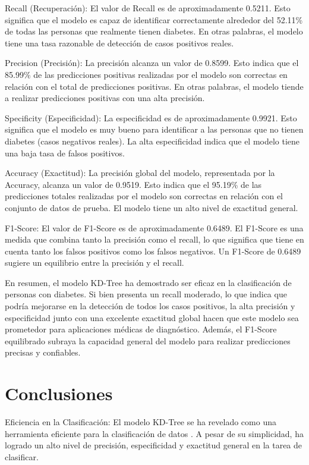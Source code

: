 \documentclass[]{article}
\begin{document}
Recall (Recuperación): El valor de Recall es de aproximadamente 0.5211. Esto significa que el modelo es capaz de identificar correctamente alrededor del 52.11\% de todas las personas que realmente tienen diabetes. En otras palabras, el modelo tiene una tasa razonable de detección de casos positivos reales.

Precision (Precisión): La precisión alcanza un valor de 0.8599. Esto indica que el 85.99\% de las predicciones positivas realizadas por el modelo son correctas en relación con el total de predicciones positivas. En otras palabras, el modelo tiende a realizar predicciones positivas con una alta precisión.

Specificity (Especificidad): La especificidad es de aproximadamente 0.9921. Esto significa que el modelo es muy bueno para identificar a las personas que no tienen diabetes (casos negativos reales). La alta especificidad indica que el modelo tiene una baja tasa de falsos positivos.

Accuracy (Exactitud): La precisión global del modelo, representada por la Accuracy, alcanza un valor de 0.9519. Esto indica que el 95.19\% de las predicciones totales realizadas por el modelo son correctas en relación con el conjunto de datos de prueba. El modelo tiene un alto nivel de exactitud general.

F1-Score: El valor de F1-Score es de aproximadamente 0.6489. El F1-Score es una medida que combina tanto la precisión como el recall, lo que significa que tiene en cuenta tanto los falsos positivos como los falsos negativos. Un F1-Score de 0.6489 sugiere un equilibrio entre la precisión y el recall.

En resumen, el modelo KD-Tree ha demostrado ser eficaz en la clasificación de personas con diabetes. Si bien presenta un recall moderado, lo que indica que podría mejorarse en la detección de todos los casos positivos, la alta precisión y especificidad junto con una excelente exactitud global hacen que este modelo sea prometedor para aplicaciones médicas de diagnóstico. Además, el F1-Score equilibrado subraya la capacidad general del modelo para realizar predicciones precisas y confiables.
\section{Conclusiones}
Eficiencia en la Clasificación: El modelo KD-Tree se ha revelado como una herramienta eficiente para la clasificación de datos . A pesar de su simplicidad, ha logrado un alto nivel de precisión, especificidad y exactitud general en la tarea de clasificar.
\end{document}
